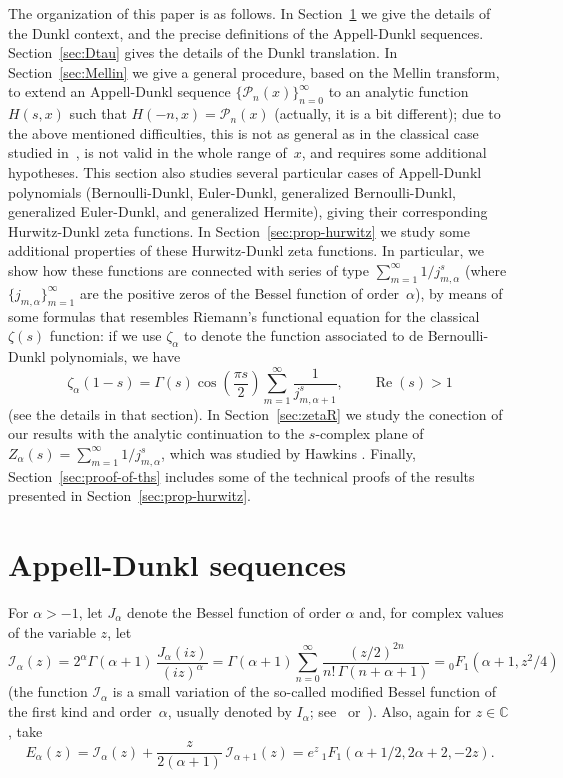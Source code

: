 \documentclass[a4paper]{amsart}
\newcommand{\C}{\mathbb{C}}
\newcommand{\I}{\mathcal{I}}
\newcommand{\Ea}{E_{\alpha}}
\newcommand{\calP}{\mathcal{P}}
\renewcommand{\Re}{\operatorname{Re}}
\theoremstyle{plain}
\theoremstyle{definition}
\theoremstyle{remark}
\numberwithin{equation}{section}
\begin{document}
The organization of this paper is as follows. In Section~\ref{sec:AD} we give the details of the Dunkl context, and the precise definitions of the Appell-Dunkl sequences. Section~\ref{sec:Dtau} gives the details of the Dunkl translation. In Section~\ref{sec:Mellin} we give a general procedure, based on the Mellin transform, to extend an Appell-Dunkl sequence $\{\calP_n(x)\}_{n=0}^{\infty}$ to an analytic function $H(s,x)$ such that $H(-n,x) = \calP_n(x)$ (actually, it is a bit different); due to the above mentioned difficulties, this is not as general as in the classical case studied in~\cite{NRV-2018}, is not valid in the whole range of~$x$, and requires some additional hypotheses. This section also studies several particular cases of Appell-Dunkl polynomials (Bernoulli-Dunkl, Euler-Dunkl, generalized Bernoulli-Dunkl, generalized Euler-Dunkl, and generalized Hermite), giving their corresponding Hurwitz-Dunkl zeta functions. In Section~\ref{sec:prop-hurwitz} we study some additional properties of these Hurwitz-Dunkl zeta functions. In particular, we show how these functions are connected with series of type $\sum_{m=1}^{\infty} 1/j_{m,\alpha}^{s}$ (where $\{j_{m,\alpha}\}_{m=1}^\infty$ are the positive zeros of the Bessel function of order~$\alpha$), by means of some formulas that resembles Riemann's functional equation for the classical $\zeta(s)$ function: if we use $\zeta_\alpha$ to denote the function associated to de Bernoulli-Dunkl polynomials, we have
\[
 \zeta_{\alpha}(1-s) = \Gamma(s) \cos{\left(\frac{\pi s}{2}\right)} 
    \sum_{m=1}^{\infty} \frac{1}{j_{m,\alpha+1}^s}, \qquad \Re(s)>1
\]
(see the details in that section). 
In Section~\ref{sec:zetaR} we study the conection of our results with the analytic continuation to the $s$-complex plane of $Z_\alpha(s) = \sum_{m=1}^{\infty} {1}/{j_{m,\alpha}^s}$, which was studied by Hawkins \cite{Haw}.
Finally, Section~\ref{sec:proof-of-ths} includes some of the technical proofs of the results presented in Section~\ref{sec:prop-hurwitz}.

\section{Appell-Dunkl sequences}
\label{sec:AD}

For $\alpha > -1$, let $J_\alpha$ denote the Bessel function of order $\alpha$ and,
for complex values of the variable $z$, let
\[
  \I_\alpha(z)
  = 2^\alpha \Gamma(\alpha+1)\, \frac{J_\alpha(iz)}{(iz)^\alpha}
  = \Gamma(\alpha+1) \sum_{n=0}^\infty \frac{(z/2)^{2n}}{n!\,\Gamma(n+\alpha+1)}
  = {}_0F_1(\alpha+1,z^2/4)
\]
(the function $\I_\alpha$ is a small variation of the so-called modified Bessel function of the first kind and order~$\alpha$, usually denoted by $I_\alpha$; see~\cite{Wat} or~\cite{OlMa-NIST}).
Also, again for $z \in \C$, take %
\begin{equation}
\label{eq:Ea}
  \Ea(z) = \I_\alpha(z) + \frac{z}{2(\alpha+1)}\,
  \I_{\alpha+1}(z)
  = e^{z} \, {}_1F_1(\alpha+1/2,2\alpha+2,-2z).
\end{equation}
\end{document}
